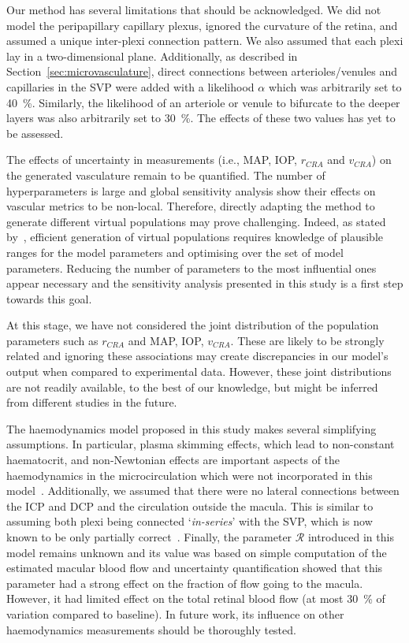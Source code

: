 \documentclass[11pt,]{article}
\begin{document}
Our method has several limitations that should be acknowledged.
We did not model the peripapillary capillary plexus, ignored the curvature of the retina, and assumed a unique inter-plexi connection pattern.
We also assumed that each plexi lay in a two-dimensional plane.
Additionally, as described in Section~\ref{sec:microvasculature}, direct connections between arterioles/venules and capillaries in the SVP were added with a likelihood $\alpha$ which was arbitrarily set to \SI{40}{\percent}.
Similarly, the likelihood of an arteriole or venule to bifurcate to the deeper layers was also arbitrarily set to \SI{30}{\percent}.
The effects of these two values has yet to be assessed.

The effects of uncertainty in measurements (i.e., MAP, IOP, $r_{CRA}$ and $v_{CRA}$) on the generated vasculature remain to be quantified.
The number of hyperparameters is large and global sensitivity analysis show their effects on vascular metrics to be non-local.
Therefore, directly adapting the method to generate different virtual populations may prove challenging.
Indeed, as stated by~\cite{Allen_2016}, efficient generation of virtual populations requires knowledge of plausible ranges for the model parameters and optimising over the set of model parameters.
Reducing the number of parameters to the most influential ones appear necessary and the sensitivity analysis presented in this study is a first step towards this goal.

At this stage, we have not considered the joint distribution of the population parameters such as $r_{CRA}$ and MAP, IOP, $v_{CRA}$.
These are likely to be strongly related and ignoring these associations may create discrepancies in our model's output when compared to experimental data.
However, these joint distributions are not readily available, to the best of our knowledge, but might be inferred from different studies in the future.

The haemodynamics model proposed in this study makes several simplifying assumptions.
In particular, plasma skimming effects, which lead to non-constant haematocrit, and non-Newtonian effects are important aspects of the haemodynamics in the microcirculation which were not incorporated in this model~\cite{Faahraeus1931,Secomb2013}.
Additionally, we assumed that there were no lateral connections between the ICP and DCP and the circulation outside the macula.
This is similar to assuming both plexi being connected `\textit{in-series}' with the SVP, which is now known to be only partially correct~\cite{An2020}.
Finally, the parameter $\mathcal R$ introduced in this model remains unknown and its value was based on simple computation of the estimated macular blood flow and uncertainty quantification showed that this parameter had a strong effect on the fraction of flow going to the macula.
However, it had limited effect on the total retinal blood flow (at most \SI{30}{\percent} of variation compared to baseline).
In future work, its influence on other haemodynamics measurements should be thoroughly tested.
\end{document}
